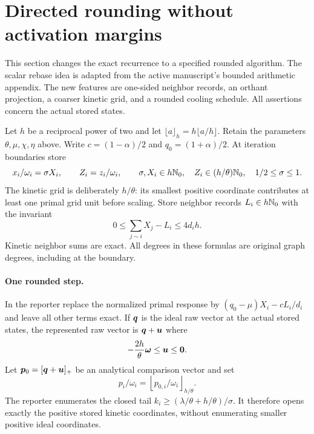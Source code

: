 \section{Directed rounding without activation margins}
\label{sec:revisit-rounding}
This section changes the exact recurrence to a specified rounded algorithm.
The scalar rebase idea is adapted from the active manuscript's bounded
arithmetic appendix. The new features are one-sided neighbor records,
an orthant projection, a coarser kinetic grid, and a rounded cooling
schedule. All assertions concern the actual stored states.

Let $h$ be a reciprocal power of two and let
$\lfloor a\rfloor_h=h\lfloor a/h\rfloor$. Retain the parameters
$\theta,\mu,\chi,\eta$ above. Write
$c=(1-\alpha)/2$ and $q_0=(1+\alpha)/2$.
At iteration boundaries store
\[
 x_i/\omega_i=\sigma X_i,\qquad Z_i=z_i/\omega_i,
 \qquad \sigma,X_i\in h\mathbb{N}_0,\quad
 Z_i\in(h/\theta)\mathbb{N}_0,\quad 1/2\leq\sigma\leq1.
\]
The kinetic grid is deliberately $h/\theta$: its smallest positive
coordinate contributes at least one primal grid unit before scaling.
Store neighbor records $L_i\in h\mathbb{N}_0$ with the invariant
\begin{equation}
 0\leq\sum_{j\sim i}X_j-L_i\leq4d_i h.
 \label{eq:revisit-directed-neighbors}
\end{equation}
Kinetic neighbor sums are exact. All degrees in these formulas are original
graph degrees, including at the boundary.

\paragraph{One rounded step.}
In the reporter replace the normalized primal response by
$(q_0-\mu)X_i-cL_i/d_i$ and leave all other terms exact. If $\bm{q}$ is
the ideal raw vector at the actual stored states, the represented raw
vector is $\bm{q}+\bm{u}$ where
\begin{equation}
 -\frac{2h}{\theta}\bm{\omega}\leq\bm{u}\leq\bm{0}.
 \label{eq:revisit-directed-raw}
\end{equation}
Let $\bm{p}_0=[\bm{q}+\bm{u}]_+$ be an analytical comparison vector and set
\[
 p_i/\omega_i=\left\lfloor p_{0,i}/\omega_i\right\rfloor_{h/\theta}.
\]
The reporter enumerates the closed tail
$k_i\geq(\lambda/\theta+h/\theta)/\sigma$. It therefore opens exactly
the positive stored kinetic coordinates, without enumerating smaller
positive ideal coordinates.

